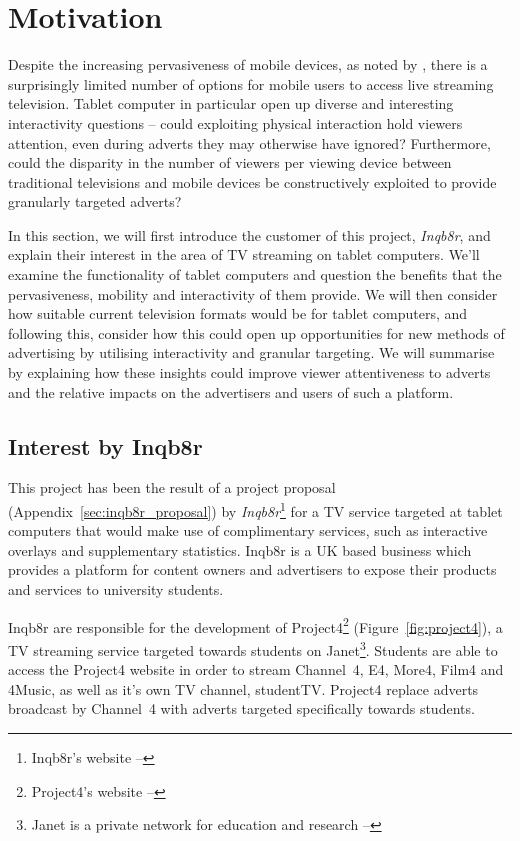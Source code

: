 \section{Motivation}

Despite the increasing pervasiveness of mobile devices, as noted by \citet{socialTV}, there is a surprisingly limited number of options for mobile users to access live streaming television. Tablet computer in particular open up diverse and interesting interactivity questions -- could exploiting physical interaction hold viewers attention, even during adverts they may otherwise have ignored? Furthermore, could the disparity in the number of viewers per viewing device between traditional televisions and mobile devices be constructively exploited to provide granularly targeted adverts?

In this section, we will first introduce the customer of this project, \textit{Inqb8r}, and explain their interest in the area of TV streaming on tablet computers. We'll examine the functionality of tablet computers and question the benefits that the pervasiveness, mobility and interactivity of them provide. We will then consider how suitable current television formats would be for tablet computers, and following this, consider how this could open up opportunities for new methods of advertising by utilising interactivity and granular targeting. We will summarise by explaining how these insights could improve viewer attentiveness to adverts and the relative impacts on the advertisers and users of such a platform.

\subsection{Interest by Inqb8r}
	\label{sec:motivation_inqb8r}
	
	This project has been the result of a project proposal (Appendix~\ref{sec:inqb8r_proposal}) by \textit{Inqb8r}\footnote{Inqb8r's website -- } for a TV service targeted at tablet computers that would make use of complimentary services, such as interactive overlays and supplementary statistics. Inqb8r is a UK based business which provides a platform for content owners and advertisers to expose their products and services to university students.

	Inqb8r are responsible for the development of Project4\footnote{Project4's website -- } (Figure~\ref{fig:project4}), a TV streaming service targeted towards students on Janet\footnote{Janet is a private network for education and research -- }. Students are able to access the Project4 website in order to stream Channel~4, E4, More4, Film4 and 4Music, as well as it's own TV channel, studentTV. Project4 replace adverts broadcast by Channel~4 with adverts targeted specifically towards students.
	
